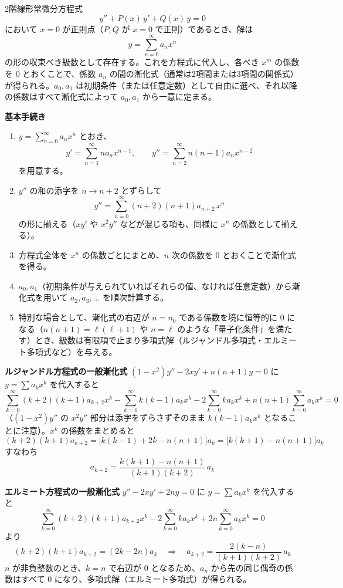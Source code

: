 \documentclass[a4paper,11pt]{article}
\begin{document}


\noindent
2階線形常微分方程式
\[
y'' + P(x)\,y' + Q(x)\,y = 0
\]
において $x=0$ が正則点（$P,Q$ が $x=0$ で正則）であるとき、解は
\[
y = \sum_{n=0}^{\infty} a_n x^{n}
\]
の形の収束べき級数として存在する。これを方程式に代入し、各べき $x^{m}$ の係数を $0$ とおくことで、係数 $a_n$ の間の漸化式（通常は2項間または3項間の関係式）が得られる。$a_0, a_1$ は初期条件（または任意定数）として自由に選べ、それ以降の係数はすべて漸化式によって $a_0, a_1$ から一意に定まる。

\medskip
\noindent
\textbf{基本手続き}
\begin{enumerate}
\item $y = \sum_{n=0}^{\infty} a_n x^n$ とおき、
\[
y' = \sum_{n=1}^{\infty} n a_n x^{n-1}, \qquad
y'' = \sum_{n=2}^{\infty} n(n-1) a_n x^{n-2}
\]
を用意する。
\item $y''$ の和の添字を $n \to n+2$ とずらして
\[
y'' = \sum_{n=0}^{\infty} (n+2)(n+1) a_{n+2}\, x^{n}
\]
の形に揃える（$xy'$ や $x^2 y''$ などが混じる項も、同様に $x^n$ の係数として揃える）。
\item 方程式全体を $x^{n}$ の係数ごとにまとめ、$n$ 次の係数を $0$ とおくことで漸化式を得る。
\item $a_0, a_1$（初期条件が与えられていればそれらの値、なければ任意定数）から漸化式を用いて $a_2, a_3, \dots$ を順次計算する。
\item 特別な場合として、漸化式の右辺が $n = n_0$ である係数を境に恒等的に $0$ になる（$n(n+1) = \ell(\ell+1)$ や $n = \ell$ のような「量子化条件」を満たす）とき、級数は有限項で止まり多項式解（ルジャンドル多項式・エルミート多項式など）を与える。
\end{enumerate}

\medskip
\noindent
\textbf{ルジャンドル方程式の一般漸化式}\quad
$(1-x^2)y'' - 2xy' + n(n+1)y = 0$ に $y=\sum a_k x^k$ を代入すると
\[
\sum_{k=0}^{\infty}(k+2)(k+1)a_{k+2}x^{k}
-\sum_{k=0}^{\infty} k(k-1)a_k x^{k}
-2\sum_{k=0}^{\infty} k a_k x^k
+ n(n+1)\sum_{k=0}^{\infty} a_k x^k = 0
\]
（$(1-x^2)y''$ の $x^2 y''$ 部分は添字をずらさずそのまま $k(k-1)a_k x^k$ となることに注意）。$x^k$ の係数をまとめると
\[
(k+2)(k+1)a_{k+2} = \big[k(k-1) + 2k - n(n+1)\big]a_k = \big[k(k+1) - n(n+1)\big]a_k
\]
すなわち
\[
a_{k+2} = \frac{k(k+1) - n(n+1)}{(k+1)(k+2)}\,a_k
\]

\medskip
\noindent
\textbf{エルミート方程式の一般漸化式}\quad
$y'' - 2xy' + 2ny = 0$ に $y = \sum a_k x^k$ を代入すると
\[
\sum_{k=0}^{\infty}(k+2)(k+1)a_{k+2}x^k - 2\sum_{k=0}^{\infty} k a_k x^k + 2n\sum_{k=0}^{\infty} a_k x^k = 0
\]
より
\[
(k+2)(k+1)a_{k+2} = (2k - 2n)a_k
\quad\Longrightarrow\quad
a_{k+2} = \frac{2(k-n)}{(k+1)(k+2)}\,a_k
\]
$n$ が非負整数のとき、$k=n$ で右辺が $0$ となるため、$a_n$ から先の同じ偶奇の係数はすべて $0$ になり、多項式解（エルミート多項式）が得られる。
\end{document}
